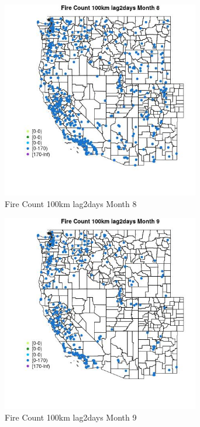 \begin{figure} 
\centering  
\includegraphics[width=0.77\textwidth]{Code_Outputs/Report_ML_input_PM25_Step4_part_e_de_duplicated_aves_compiled_2019-05-18wNAs_MapObsMo8Fire_Count_100km_lag2days.jpg} 
\caption{\label{fig:Report_ML_input_PM25_Step4_part_e_de_duplicated_aves_compiled_2019-05-18wNAsMapObsMo8Fire_Count_100km_lag2days}Fire Count 100km lag2days Month 8} 
\end{figure} 
 

\begin{figure} 
\centering  
\includegraphics[width=0.77\textwidth]{Code_Outputs/Report_ML_input_PM25_Step4_part_e_de_duplicated_aves_compiled_2019-05-18wNAs_MapObsMo9Fire_Count_100km_lag2days.jpg} 
\caption{\label{fig:Report_ML_input_PM25_Step4_part_e_de_duplicated_aves_compiled_2019-05-18wNAsMapObsMo9Fire_Count_100km_lag2days}Fire Count 100km lag2days Month 9} 
\end{figure} 
 

